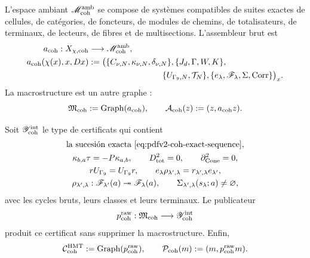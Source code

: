 L'espace ambiant \(\mathscr M_{\rm coh}^{\rm amb}\) se compose de systèmes
compatibles de suites exactes de cellules, de catégories, de foncteurs, de modules de
chemins, de totalisateurs, de terminaux, de lecteurs, de fibres et de multisections.
L'assembleur brut est
\begin{equation}\label{eq:pdfv2-coh-assembler}
 \begin{aligned}
 a_{\rm coh}:X_{\chi,{\rm coh}}&\longrightarrow
 \mathscr M_{\rm coh}^{\rm amb},\\
 a_{\rm coh}(\chi(x),x,Dx)
 &:={}
 \bigl(
 \{C_{\nu,N},\kappa_{\nu,N},\delta_{\nu,N}\},
 \{J_d,\Gamma,W,K\},\\
 &\hspace{31mm}
 \{U_{\Gamma_9,N},\mathcal T_N\},
 \{e_\lambda,\mathscr F_\lambda,\Sigma,\operatorname{Corr}\}
 \bigr)_x.
 \end{aligned}
\end{equation}
La macrostructure est un autre graphe :
\begin{equation}\label{eq:pdfv2-coh-macro-graph}
 \mathfrak M_{\rm coh}:=\operatorname{Graph}(a_{\rm coh}),
 \qquad
 \mathcal A_{\rm coh}(z):=(z,a_{\rm coh}z).
\end{equation}

Soit \(\mathscr Y_{\rm coh}^{\rm int}\) le type de certificats qui contient
\begin{equation}\label{eq:pdfv2-coh-certificate-list}
 \begin{gathered}
 \text{la sucesión exacta \eqref{eq:pdfv2-coh-exact-sequence}},\\
 \kappa_{b,a}\tau=-P\kappa_{a,b},
 \qquad D_{\rm tot}^2=0,
 \qquad\partial_{\rm Cone}^2=0,\\
 rU_{\Gamma_9}=U_{\Gamma_9}r,
 \qquad
 e_\lambda\rho_{\lambda',\lambda}
 =r_{\lambda',\lambda}e_{\lambda'},\\
 \rho_{\lambda',\lambda}:\mathscr F_{\lambda'}(a)
 \twoheadrightarrow\mathscr F_\lambda(a),
 \qquad
 \Sigma_{\lambda',\lambda}(s_\lambda;a)\neq\varnothing,
 \end{gathered}
\end{equation}
avec les cycles bruts, leurs classes et leurs terminaux. Le publicateur
\begin{equation}\label{eq:pdfv2-coh-publisher}
 p_{\rm coh}^{\rm raw}:\mathfrak M_{\rm coh}
 \longrightarrow\mathscr Y_{\rm coh}^{\rm int}
\end{equation}
produit ce certificat sans supprimer la macrostructure. Enfin,
\begin{equation}\label{eq:pdfv2-coh-output-graph}
 \mathcal C_{\rm coh}^{\rm HMT}
 :=\operatorname{Graph}(p_{\rm coh}^{\rm raw}),
 \qquad
 \mathcal P_{\rm coh}(m):=(m,p_{\rm coh}^{\rm raw}m).
\end{equation}

